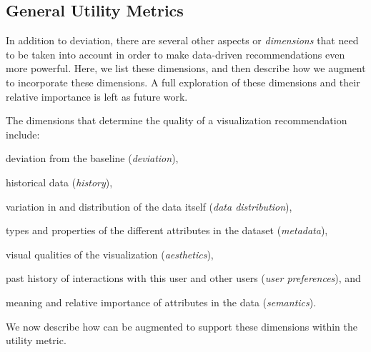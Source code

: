 {%

\subsection{General Utility Metrics}\label{sec:gen_util}

In addition to deviation, there are several other aspects
or {\em dimensions} that need to be taken into account
in order to make data-driven recommendations even more powerful.
Here, we list these dimensions, and then describe how 
we augment \SeeDB to incorporate these dimensions.
A full exploration of these dimensions
and their relative importance is left as future work.
  
The dimensions that determine the quality of a visualization recommendation
include:
  \begin{inparaenum}
  \item deviation from the baseline ({\it deviation}),
  \item historical data ({\em history}),
  \item variation in and distribution of the data itself ({\it data distribution}),
  \item types and properties of the different attributes in the dataset ({\it metadata}), 
\item visual qualities of the visualization ({\it aesthetics}),  
\item past history of interactions with this user and other users ({\it user preferences}), and 
\item meaning and relative importance of attributes in the data ({\it semantics}). 
\end{inparaenum}
We now describe how \SeeDB can be augmented to support these dimensions
within the utility metric.

}
